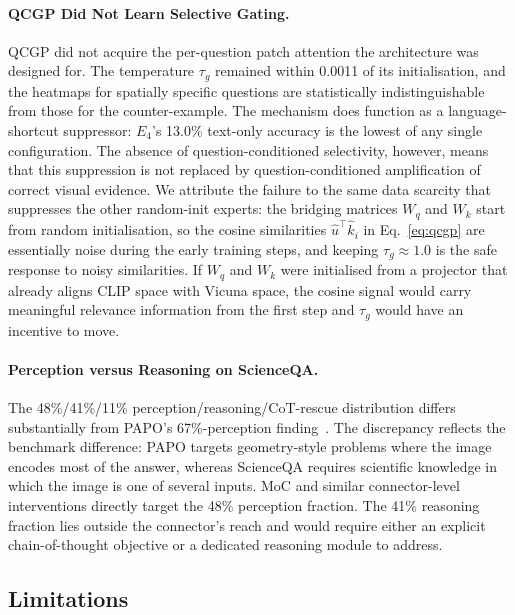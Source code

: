 \documentclass{article}
\begin{document}
\paragraph{QCGP Did Not Learn Selective Gating.}
QCGP did not acquire the per-question patch attention the architecture was designed for. The temperature $\tau_g$ remained within 0.0011 of its initialisation, and the heatmaps for spatially specific questions are statistically indistinguishable from those for the counter-example. The mechanism does function as a language-shortcut suppressor: $E_4$'s 13.0\% text-only accuracy is the lowest of any single configuration. The absence of question-conditioned selectivity, however, means that this suppression is not replaced by question-conditioned amplification of correct visual evidence. We attribute the failure to the same data scarcity that suppresses the other random-init experts: the bridging matrices $W_q$ and $W_k$ start from random initialisation, so the cosine similarities $\hat{u}^\top \hat{k}_i$ in Eq.~\ref{eq:qcgp} are essentially noise during the early training steps, and keeping $\tau_g \approx 1.0$ is the safe response to noisy similarities. If $W_q$ and $W_k$ were initialised from a projector that already aligns CLIP space with Vicuna space, the cosine signal would carry meaningful relevance information from the first step and $\tau_g$ would have an incentive to move.

\paragraph{Perception versus Reasoning on ScienceQA.}
The 48\%/41\%/11\% perception/reasoning/CoT-rescue distribution differs substantially from PAPO's 67\%-perception finding~\citep{wang2026papo}. The discrepancy reflects the benchmark difference: PAPO targets geometry-style problems where the image encodes most of the answer, whereas ScienceQA requires scientific knowledge in which the image is one of several inputs. MoC and similar connector-level interventions directly target the 48\% perception fraction. The 41\% reasoning fraction lies outside the connector's reach and would require either an explicit chain-of-thought objective or a dedicated reasoning module to address.

\subsection{Limitations}
\label{sec:limitations}
\end{document}
